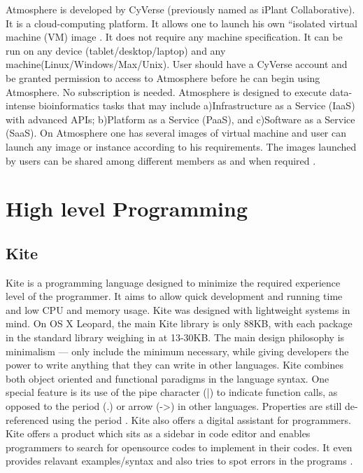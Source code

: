      Atmosphere is developed by CyVerse (previously named as iPlant
     Collaborative).  It is a cloud-computing platform. It allows one
     to launch his own ``isolated virtual machine (VM) image
     \cite{www-at1}.  It does not require any machine
     specification. It can be run on any device
     (tablet/desktop/laptop) and any machine(Linux/Windows/Max/Unix).
     User should have a CyVerse account and be granted permission to
     access to Atmosphere before he can begin using Atmosphere. No
     subscription is needed.  Atmosphere is designed to execute
     data-intense bioinformatics tasks that may include
     a)Infrastructure as a Service (IaaS) with advanced APIs;
     b)Platform as a Service (PaaS), and c)Software as a Service
     (SaaS).  On Atmosphere one has several images of virtual machine
     and user can launch any image or instance according to his
     requirements.  The images launched by users can be shared among
     different members as and when required \cite{www-at2}.

\section{High level Programming}
\label{S:o-programming}

\subsection{Kite}

     Kite is a programming language designed to minimize the required
     experience level of the programmer.  It aims to allow quick
     development and running time and low CPU and memory usage. Kite
     was designed with lightweight systems in mind.  On OS X Leopard,
     the main Kite library is only 88KB, with each package in the
     standard library weighing in at 13-30KB. The main design
     philosophy is minimalism — only include the minimum necessary,
     while giving developers the power to write anything that they can
     write in other languages. Kite combines both object oriented and
     functional paradigms in the language syntax.  One special feature
     is its use of the pipe character (|) to indicate function calls,
     as opposed to the period (.) or arrow (->) in other languages.
     Properties are still de-referenced using the period
     \cite{kite-devtopics}. Kite also offers a digital assistant for
     programmers. Kite offers a product which sits as a sidebar in
     code editor and enables programmers to search for opensource
     codes to implement in their codes. It even provides relavant
     examples/syntax and also tries to spot errors in the programs
     \cite{kite-wired}.
	   

